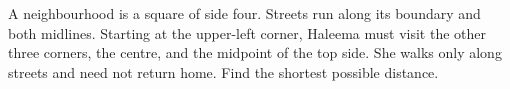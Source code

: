 A neighbourhood is a square of side four. Streets run along its boundary and both midlines. Starting at the upper-left corner, Haleema must visit the other three corners, the centre, and the midpoint of the top side. She walks only along streets and need not return home. Find the shortest possible distance.
